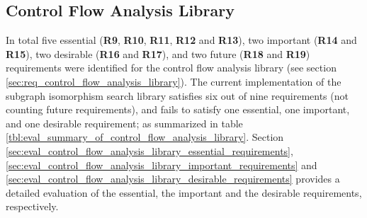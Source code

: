 
\subsection{Control Flow Analysis Library}
\label{sec:eval_control_flow_analysis_library}

In total five essential (\textbf{R9}, \textbf{R10}, \textbf{R11}, \textbf{R12} and \textbf{R13}), two important (\textbf{R14} and \textbf{R15}), two desirable (\textbf{R16} and \textbf{R17}), and two future (\textbf{R18} and \textbf{R19}) requirements were identified for the control flow analysis library (see section \ref{sec:req_control_flow_analysis_library}). The current implementation of the subgraph isomorphism search library satisfies six out of nine requirements (not counting future requirements), and fails to satisfy one essential, one important, and one desirable requirement; as summarized in table \ref{tbl:eval_summary_of_control_flow_analysis_library}. Section \ref{sec:eval_control_flow_analysis_library_essential_requirements}, \ref{sec:eval_control_flow_analysis_library_important_requirements} and \ref{sec:eval_control_flow_analysis_library_desirable_requirements} provides a detailed evaluation of the essential, the important and the desirable requirements, respectively.

